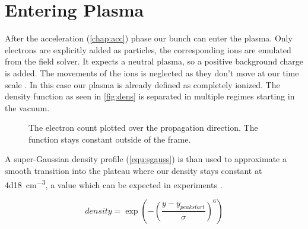 \documentclass[bachelor_thesis]{subfiles}
\begin{document}
\section{Entering Plasma}\label{chap:plasma}
 After the acceleration (\autoref{chap:acc}) phase our bunch can enter the plasma.
Only electrons are explicitly added as particles, the corresponding ions are emulated from the field solver. It expects a neutral plasma, so a positive background charge is added. 
The movements of the ions is neglected as they don't move at our time scale . In this case our plasma is already defined as completely ionized.
The density function as seen in \autoref{fig:dens} is separated in multiple regimes starting in the vacuum. 

\begin{figure}
	\centering
	
	\caption{The electron count plotted over the propagation direction. The function stays constant outside of the frame.}
	\label{fig:dens}
\end{figure}

A super-Gaussian density profile (\autoref{equ:sgauss}) is than used to approximate a smooth transition into the plateau where our density stays constant at \qty{4d18}{\cm^{-3}}, a value which can be expected in experiments \cite{Schoebel2022, Kurz2021}. 

\begin{equation}
	density = \exp\left(-\left(\frac{y-y_{peak start}}{\sigma}\right)^6\right)
	\label{equ:sgauss}
\end{equation}
\end{document}
